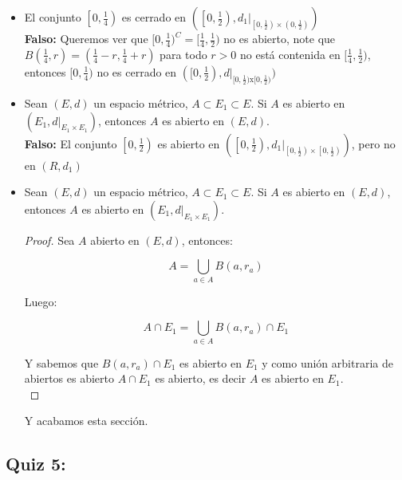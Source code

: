 \begin{itemize}[leftmargin=*]
\item  El conjunto $\left[0, \frac{1}{4}\right)$ es cerrado en $\left(\left[0, \frac{1}{2}\right),\left.d_1\right|_{\left[0, \frac{1}{2}\right) \times\left(0, \frac{1}{2}\right)}\right)$\\

\textbf{Falso: }Queremos ver que $[0,\frac{1}{4})^C=[\frac{1}{4},\frac{1}{2})$ no es abierto, note que $B(\frac{1}{4},r)=(\frac{1}{4}-r,\frac{1}{4}+r)$ para todo $r>0$ no está contenida en $[\frac{1}{4},\frac{1}{2})$, entonces $[0,\frac{1}{4})$ no es cerrado en $([0,\frac{1}{2}),d|_{[0,\frac{1}{2})\text{x}[0,\frac{1}{2})})$ 

\item  Sean $(E, d)$ un espacio métrico, $A \subset E_1 \subset E$. Si $A$ es abierto en $\left(E_1,\left.d\right|_{E_1 \times E_1}\right)$, entonces $A$ es abierto en $(E, d)$.\\

\textbf{Falso: }El conjunto $\left[0, \frac{1}{2}\right)$ es abierto en $\left(\left[0, \frac{1}{2}\right),\left.d_1\right|_{\left[0, \frac{1}{2}\right) \times\left[0, \frac{1}{2}\right)}\right)$, pero no en $(R,d_1)$

\item Sean $(E, d)$ un espacio métrico, $A \subset E_1 \subset E$. Si $A$ es abierto en $(E, d)$, entonces $A$ es abierto en $\left(E_1,\left.d\right|_{E_1 \times E_1}\right)$.\\

\begin{proof}
    Sea $A$ abierto en $(E,d)$, entonces:

    $$A=\bigcup_{a\in A} B(a,r_a)$$

    Luego:

    $$A\cap E_1=\bigcup_{a\in A} B(a,r_a)\cap E_1$$

Y sabemos que $B(a,r_a)\cap E_1$ es abierto en $E_1$ y como unión arbitraria de abiertos es abierto $A\cap E_1$ es abierto, es decir $A$ es abierto en $E_1$.\\
\end{proof}

Y acabamos esta sección.
\end{itemize}


\subsection{Quiz 5: }

